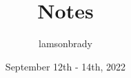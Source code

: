 \usepackage[utf8]{inputenc}

\title{Notes}
\author{lamsonbrady }
\date{September 12th - 14th, 2022}

\usepackage{parskip}

\usepackage{fancyhdr}
\pagestyle{fancy}

\usepackage{amsmath}
\usepackage{amssymb}
\usepackage{graphicx}
\newcommand{\psmall}[1]{
\left(\begin{smallmatrix}
#1
\end{smallmatrix} \right)
}

\newcommand{\bb}{\mathbb}
\newcommand{\R}{\mathbb{R}}
\renewcommand{\P}{\mathbb{P}}
\newcommand{\Z}{\mathbb{Z}}

\newcommand{\genericvec}[1]{
	\ensuremath{
		\left\{\vec{#1_1}, \vec{#1_2}, \dots, \vec{#1_n} \right\}
	}
}
